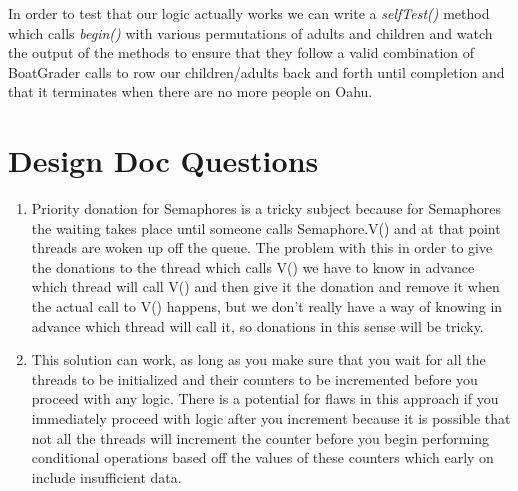 \documentclass{article}
\begin{document}
In order to test that our logic actually works we can write a \textit{selfTest()} method which calls \textit{begin()}
with various permutations of adults and children and watch the output of the methods to ensure that they follow a valid
combination of BoatGrader calls to row our children/adults back and forth until completion and that it terminates when
there are no more people on Oahu.

\section*{Design Doc Questions}
\begin{enumerate}
\item Priority donation for Semaphores is a tricky subject because for Semaphores the waiting takes place until someone
calls Semaphore.V() and at that point threads are woken up off the queue. The problem with this in order to give the
donations to the thread which calls V() we have to know in advance which thread will call V() and then give it the
donation and remove it when the actual call to V() happens, but we don't really have a way of knowing in advance which
thread will call it, so donations in this sense will be tricky.
\item This solution can work, as long as you make sure that you wait for all the threads to be initialized and their
counters to be incremented before you proceed with any logic. There is a potential for flaws in this approach if you
immediately proceed with logic after you increment because it is possible that not all the threads will increment the
counter before you begin performing conditional operations based off the values of these counters which early on include
insufficient data.
\end{enumerate}
\end{document}
